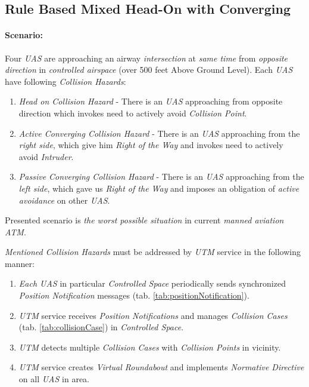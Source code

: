 \subsection{Rule Based Mixed Head-On with Converging}\label{s:testRuleMixed}

\paragraph{Scenario:} Four \emph{UAS} are approaching an airway \emph{intersection} at \emph{same time} from \emph{opposite direction} in \emph{controlled airspace} (over 500 feet Above Ground Level). Each \emph{UAS} have following \emph{Collision Hazards}:
\begin{enumerate}
	\item \emph{Head on Collision Hazard} - There is an \emph{UAS} approaching from opposite direction which invokes need to actively avoid \emph{Collision Point}.

	\item \emph{Active Converging Collision Hazard} -  There is an \emph{UAS} approaching from the \emph{right side}, which give him \emph{Right of the Way} and invokes need to actively avoid \emph{Intruder}.

	\item \emph{Passive Converging Collision Hazard} - There is an \emph{UAS} approaching from the \emph{left side}, which gave us \emph{Right of the Way} and imposes an obligation of \emph{active avoidance} on other \emph{UAS}.
\end{enumerate}

\begin{note}
	Presented scenario is \emph{the worst possible situation} in current \emph{manned aviation ATM}. 
\end{note}

\noindent\emph{Mentioned Collision Hazards} must be addressed by \emph{UTM} service in the following manner:

\begin{enumerate}
	\item \emph{Each UAS} in particular \emph{Controlled Space} periodically sends synchronized \emph{Position Notification} messages (tab. \ref{tab:positionNotification}). 
	
	\item \emph{UTM} service receives \emph{Position Notifications} and manages \emph{Collision Cases} (tab. \ref{tab:collisionCase}) in \emph{Controlled Space}. 
	
	\item \emph{UTM} detects multiple \emph{Collision Cases} with \emph{Collision Points} in  vicinity.
	
	\item \emph{UTM} service creates \emph{Virtual Roundabout} and implements \emph{Normative Directive} on all \emph{UAS} in area.
\end{enumerate}

